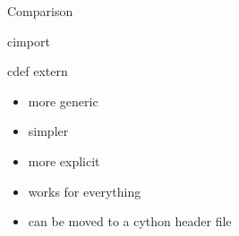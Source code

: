 \documentclass[11pt]{beamer}
\begin{document}
\begin{frame}[fragile]{Comparison}
	\begin{minipage}{0.45\linewidth}
		cimport
	\end{minipage}
	\begin{minipage}{0.45\linewidth}
		cdef extern
	\end{minipage}
	
	\begin{minipage}{0.45\linewidth}
		\begin{itemize}
			\item more generic
			\item simpler
		\end{itemize}
	\end{minipage}
	\begin{minipage}{0.45\linewidth}		
		\begin{itemize}
			\item more explicit
			\item works for everything
			\item<2-> can be moved to a cython header file
		\end{itemize}
	\end{minipage}
\end{frame}
\end{document}
